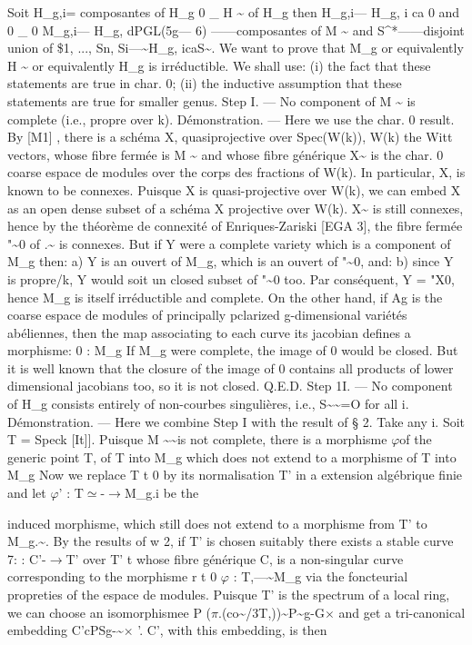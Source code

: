 \documentclass[11pt]{article}
\theoremstyle{plain}
\theoremstyle{definition}
\theoremstyle{remark}
\begin{document}
Soit H\_g,i= composantes of H\_g 0 \_ H \textasciitilde{} of H\_g then H\_g,i--- H\_g, i ca 0 and 0 \_ 0 M\_g,i--- H\_g, dPGL(5g--- 6) ------composantes of M \textasciitilde{} and S\textasciicircum{}*------disjoint union of \$1, ..., Sn, Si---\textasciitilde{}H\_g, icaS\textasciitilde{}. We want to prove that M\_g or equivalently H \textasciitilde{} or equivalently H\_g is irr\'eductible. We shall use: (i) the fact that these statements are true in char. 0; (ii) the inductive assumption that these statements are true for smaller genus. Step I. --- No component of M \textasciitilde{} is complete (i.e., propre over k). D\'emonstration. --- Here we use the char. 0 result. By [M1] , there is a sch\'ema X, quasiprojective over Spec(W(k)), W(k) the Witt vectors, whose fibre ferm\'ee is M \textasciitilde{} and whose fibre g\'en\'erique X\textasciitilde{} is the char. 0 coarse espace de modules over the corps des fractions of W(k). In particular, X, is known to be connexes. Puisque X is quasi-projective over W(k), we can embed X as an open dense subset of a sch\'ema X projective over W(k). X\textasciitilde{} is still connexes, hence by the th\'eor\`eme de connexit\'e of Enriques-Zariski [EGA 3], the fibre ferm\'ee "\textasciitilde{}0 of .\textasciitilde{} is connexes. But if Y were a complete variety which is a component of M\_g then: a) Y is an ouvert of M\_g, which is an ouvert of "\textasciitilde{}0, and: b) since Y is propre/k, Y would soit un closed subset of "\textasciitilde{}0 too. Par cons\'equent, Y = "X0, hence M\_g is itself irr\'eductible and complete. On the other hand, if Ag is the coarse espace de modules of principally pclarized g-dimensional vari\'et\'es ab\'eliennes, then the map associating to each curve its jacobian defines a morphisme: 0 : M\_g If M\_g were complete, the image of 0 would be closed. But it is well known that the closure of the image of 0 contains all products of lower dimensional jacobians too, so it is not closed. Q.E.D. Step 1I. --- No component of H\_g consists entirely of non-courbes singuli\`eres, i.e., S\textasciitilde{}\textasciitilde{}=O for all i. D\'emonstration. --- Here we combine Step I with the result of § 2. Take any i. Soit T = Speck [It]]. Puisque M \textasciitilde{}\textasciitilde{}is not complete, there is a morphisme $\varphi$of the generic point T, of T into M\_g which does not extend to a morphisme of T into M\_g Now we replace T t 0 by its normalisation T' in a extension alg\'ebrique finie and let $\varphi$' : T$\simeq$-$\to$M\_g.i be the

induced morphisme, which still does not extend to a morphisme from T' to M\_g.\textasciitilde{}. By the results of w 2, if T' is chosen suitably there exists a stable curve 7: : C'-$\to$T' over T' t whose fibre g\'en\'erique C, is a non-singular curve corresponding to the morphisme r t 0 $\varphi$ : T,---\textasciitilde{}M\_g via the foncteurial propreties of the espace de modules. Puisque T' is the spectrum of a local ring, we can choose an isomorphismee P ($\pi$.(co\textasciitilde{}/3T,))\textasciitilde{}P\textasciitilde{}g-G$\times$ and get a tri-canonical embedding C'cPSg-\textasciitilde{}$\times$ '. C', with this embedding, is then
\end{document}
